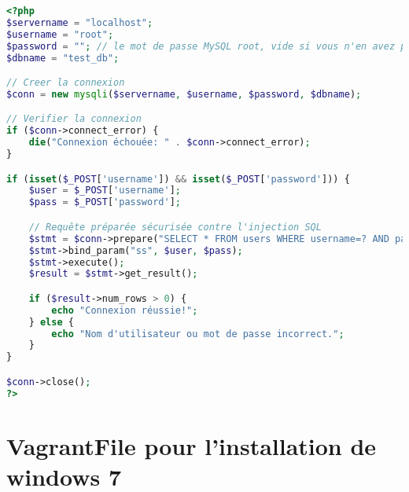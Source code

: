 \documentclass[a4paper,12pt]{report}
\begin{document}
\begin{lstlisting}[language=PHP, caption=Code sécurisé contre l'injection SQL]
<?php
$servername = "localhost";
$username = "root";
$password = ""; // le mot de passe MySQL root, vide si vous n'en avez pas défini un
$dbname = "test_db";

// Creer la connexion
$conn = new mysqli($servername, $username, $password, $dbname);

// Verifier la connexion
if ($conn->connect_error) {
    die("Connexion échouée: " . $conn->connect_error);
}

if (isset($_POST['username']) && isset($_POST['password'])) {
    $user = $_POST['username'];
    $pass = $_POST['password'];

    // Requête préparée sécurisée contre l'injection SQL
    $stmt = $conn->prepare("SELECT * FROM users WHERE username=? AND password=?");
    $stmt->bind_param("ss", $user, $pass);
    $stmt->execute();
    $result = $stmt->get_result();

    if ($result->num_rows > 0) {
        echo "Connexion réussie!";
    } else {
        echo "Nom d'utilisateur ou mot de passe incorrect.";
    }
}

$conn->close();
?>
\end{lstlisting}

\section{VagrantFile pour l'installation de windows 7}
\end{document}
